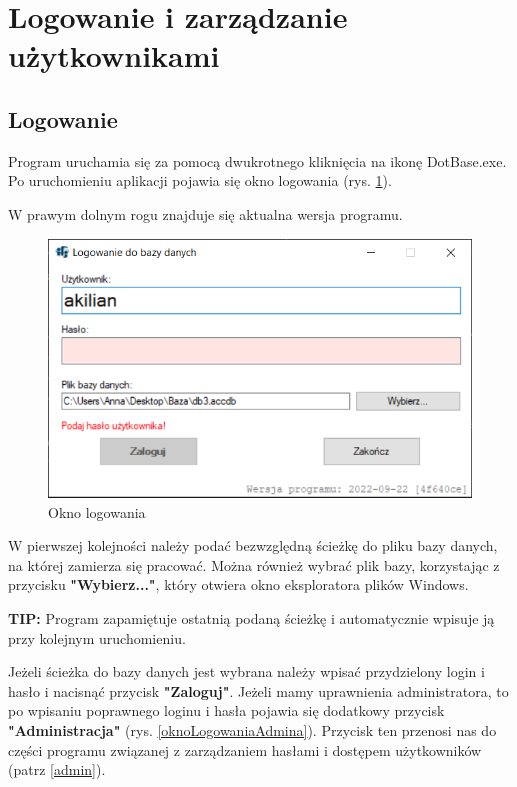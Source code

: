 
\rozdzial

\section{Logowanie i zarządzanie użytkownikami}

\subsection{Logowanie}

Program uruchamia się za pomocą dwukrotnego kliknięcia na ikonę DotBase.exe.
Po uruchomieniu aplikacji pojawia się okno logowania (rys. \ref{oknoLogowania}).

W prawym dolnym rogu znajduje się aktualna wersja programu.

\begin{figure}[htb]
	\centering
	\includegraphics{obrazki/Logowanie/logowanie.png}
	\caption{Okno logowania}
	\label{oknoLogowania}
\end{figure}

W pierwszej kolejności należy podać bezwzględną ścieżkę do pliku bazy danych, na której zamierza się pracować. Można również wybrać plik bazy, korzystając z przycisku \textbf{"Wybierz..."}, który otwiera okno eksploratora plików Windows. 

\textbf{TIP:} Program zapamiętuje ostatnią podaną ścieżkę i automatycznie wpisuje ją przy kolejnym uruchomieniu.

Jeżeli ścieżka do bazy danych jest wybrana należy wpisać przydzielony login i hasło i nacisnąć przycisk \textbf{"Zaloguj"}.
Jeżeli mamy uprawnienia administratora, to po wpisaniu poprawnego loginu i hasła pojawia się dodatkowy przycisk \textbf{"Administracja"} (rys. \ref{oknoLogowaniaAdmina}). Przycisk ten przenosi nas do części programu związanej z zarządzaniem hasłami i dostępem użytkowników (patrz \ref{admin}).

